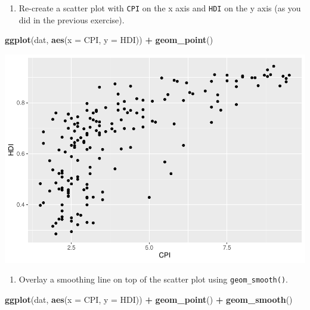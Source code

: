 \documentclass[
]{book}
\newenvironment{Shaded}{\begin{snugshade}}{\end{snugshade}}
\newcommand{\DataTypeTok}[1]{\textcolor[rgb]{0.13,0.29,0.53}{#1}}
\newcommand{\KeywordTok}[1]{\textcolor[rgb]{0.13,0.29,0.53}{\textbf{#1}}}
\newcommand{\NormalTok}[1]{#1}
\newcommand{\OperatorTok}[1]{\textcolor[rgb]{0.81,0.36,0.00}{\textbf{#1}}}
\newcommand{\StringTok}[1]{\textcolor[rgb]{0.31,0.60,0.02}{#1}}
\providecommand{\tightlist}{%
  \setlength{\itemsep}{0pt}\setlength{\parskip}{0pt}}
\begin{document}
\begin{alert}

\begin{enumerate}
\def\labelenumi{\arabic{enumi}.}
\tightlist
\item
  Re-create a scatter plot with \texttt{CPI} on the x axis and \texttt{HDI} on the y axis (as you did in the previous exercise).
\end{enumerate}

\begin{Shaded}
\begin{Highlighting}[]
\KeywordTok{ggplot}\NormalTok{(dat, }\KeywordTok{aes}\NormalTok{(}\DataTypeTok{x =}\NormalTok{ CPI, }\DataTypeTok{y =}\NormalTok{ HDI)) }\OperatorTok{+}
\StringTok{  }\KeywordTok{geom\_point}\NormalTok{()}
\end{Highlighting}
\end{Shaded}

\includegraphics{R/Rgraphics/figures/unnamed-chunk-192-1.pdf}

\begin{enumerate}
\def\labelenumi{\arabic{enumi}.}
\setcounter{enumi}{1}
\tightlist
\item
  Overlay a smoothing line on top of the scatter plot using \texttt{geom\_smooth()}.
\end{enumerate}

\begin{Shaded}
\begin{Highlighting}[]
\KeywordTok{ggplot}\NormalTok{(dat, }\KeywordTok{aes}\NormalTok{(}\DataTypeTok{x =}\NormalTok{ CPI, }\DataTypeTok{y =}\NormalTok{ HDI)) }\OperatorTok{+}
\StringTok{  }\KeywordTok{geom\_point}\NormalTok{() }\OperatorTok{+}
\StringTok{  }\KeywordTok{geom\_smooth}\NormalTok{()}
\end{Highlighting}
\end{Shaded}


\end{alert}
\end{document}
